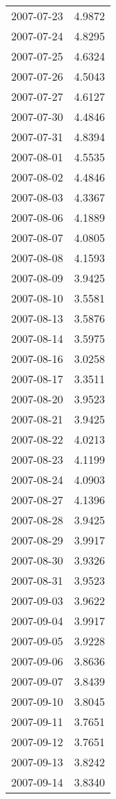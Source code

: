 \begin{tabular}{lr}
2007-07-23 &      4.9872 \\
2007-07-24 &      4.8295 \\
2007-07-25 &      4.6324 \\
2007-07-26 &      4.5043 \\
2007-07-27 &      4.6127 \\
2007-07-30 &      4.4846 \\
2007-07-31 &      4.8394 \\
2007-08-01 &      4.5535 \\
2007-08-02 &      4.4846 \\
2007-08-03 &      4.3367 \\
2007-08-06 &      4.1889 \\
2007-08-07 &      4.0805 \\
2007-08-08 &      4.1593 \\
2007-08-09 &      3.9425 \\
2007-08-10 &      3.5581 \\
2007-08-13 &      3.5876 \\
2007-08-14 &      3.5975 \\
2007-08-16 &      3.0258 \\
2007-08-17 &      3.3511 \\
2007-08-20 &      3.9523 \\
2007-08-21 &      3.9425 \\
2007-08-22 &      4.0213 \\
2007-08-23 &      4.1199 \\
2007-08-24 &      4.0903 \\
2007-08-27 &      4.1396 \\
2007-08-28 &      3.9425 \\
2007-08-29 &      3.9917 \\
2007-08-30 &      3.9326 \\
2007-08-31 &      3.9523 \\
2007-09-03 &      3.9622 \\
2007-09-04 &      3.9917 \\
2007-09-05 &      3.9228 \\
2007-09-06 &      3.8636 \\
2007-09-07 &      3.8439 \\
2007-09-10 &      3.8045 \\
2007-09-11 &      3.7651 \\
2007-09-12 &      3.7651 \\
2007-09-13 &      3.8242 \\
2007-09-14 &      3.8340 \\

\end{tabular}
